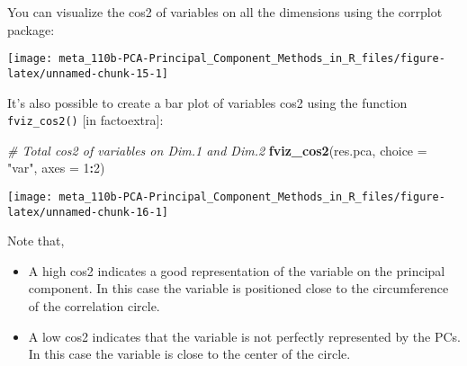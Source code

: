 \documentclass[]{book}
\newenvironment{Shaded}{\begin{snugshade}}{\end{snugshade}}
\newcommand{\CommentTok}[1]{\textcolor[rgb]{0.56,0.35,0.01}{\textit{#1}}}
\newcommand{\DataTypeTok}[1]{\textcolor[rgb]{0.13,0.29,0.53}{#1}}
\newcommand{\DecValTok}[1]{\textcolor[rgb]{0.00,0.00,0.81}{#1}}
\newcommand{\KeywordTok}[1]{\textcolor[rgb]{0.13,0.29,0.53}{\textbf{#1}}}
\newcommand{\NormalTok}[1]{#1}
\newcommand{\OperatorTok}[1]{\textcolor[rgb]{0.81,0.36,0.00}{\textbf{#1}}}
\newcommand{\OtherTok}[1]{\textcolor[rgb]{0.56,0.35,0.01}{#1}}
\newcommand{\StringTok}[1]{\textcolor[rgb]{0.31,0.60,0.02}{#1}}
\begin{document}
\begin{Shaded}
\end{Shaded}

You can visualize the cos2 of variables on all the dimensions using the corrplot package:

\begin{Shaded}
\end{Shaded}

\begin{center}\texttt{[image: meta\_110b-PCA-Principal\_Component\_Methods\_in\_R\_files/figure-latex/unnamed-chunk-15-1]} \end{center}

It's also possible to create a bar plot of variables cos2 using the function \texttt{fviz\_cos2()} {[}in factoextra{]}:

\begin{Shaded}
\begin{Highlighting}[]
\CommentTok{# Total cos2 of variables on Dim.1 and Dim.2}
\KeywordTok{fviz_cos2}\NormalTok{(res.pca, }\DataTypeTok{choice =} \StringTok{"var"}\NormalTok{, }\DataTypeTok{axes =} \DecValTok{1}\OperatorTok{:}\DecValTok{2}\NormalTok{)}
\end{Highlighting}
\end{Shaded}

\begin{center}\texttt{[image: meta\_110b-PCA-Principal\_Component\_Methods\_in\_R\_files/figure-latex/unnamed-chunk-16-1]} \end{center}

Note that,

\begin{itemize}
\item
  A high cos2 indicates a good representation of the variable on the principal component. In this case the variable is positioned close to the circumference of the correlation circle.
\item
  A low cos2 indicates that the variable is not perfectly represented by the PCs. In this case the variable is close to the center of the circle.
\end{itemize}
\end{document}

